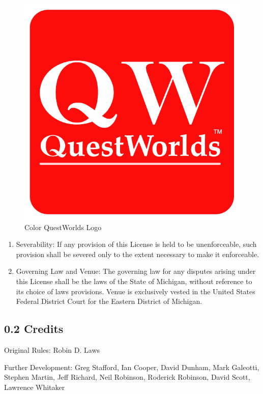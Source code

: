 \documentclass[
]{article}
\begin{document}
\begin{figure}
\centering
\includegraphics{Logos/QuestWorlds-Logo-TM.png}
\caption{Color QuestWorlds Logo}
\end{figure}

\begin{enumerate}
\def\labelenumi{\arabic{enumi}.}
\setcounter{enumi}{15}
\item
  Severability: If any provision of this License is held to be
  unenforceable, such provision shall be severed only to the extent
  necessary to make it enforceable.
\item
  Governing Law and Venue: The governing law for any disputes arising
  under this License shall be the laws of the State of Michigan, without
  reference to its choice of laws provisions. Venue is exclusively
  vested in the United States Federal District Court for the Eastern
  District of Michigan.
\end{enumerate}

\hypertarget{credits}{%
\subsection{0.2 Credits}\label{credits}}

Original Rules: Robin D. Laws

Further Development: Greg Stafford, Ian Cooper, David Dunham, Mark
Galeotti, Stephen Martin, Jeff Richard, Neil Robinson, Roderick
Robinson, David Scott, Lawrence Whitaker
\end{document}
